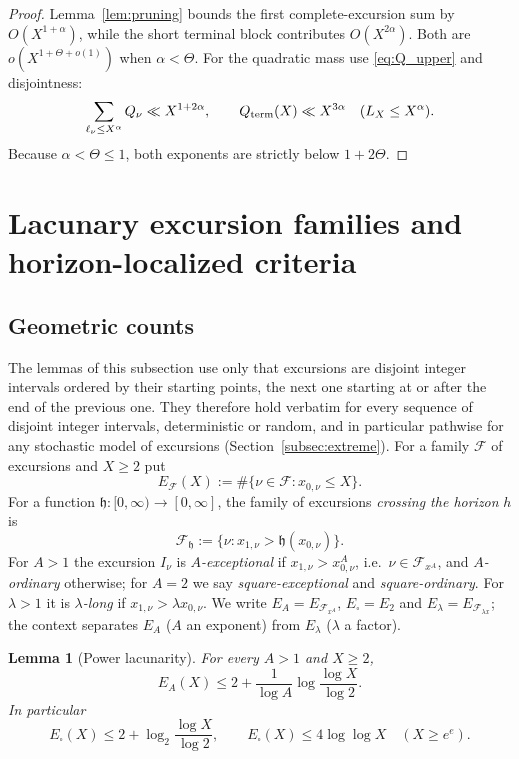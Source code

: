 \documentclass[11pt]{amsart}
\numberwithin{equation}{section}
\theoremstyle{plain}
\newtheorem{lemma}[theorem]{Lemma}
\theoremstyle{definition}
\theoremstyle{remark}
\newcommand{\F}{\mathcal{F}}
\begin{document}
\begin{proof}
Lemma~\ref{lem:pruning} bounds the first complete-excursion sum by
$O(X^{1+\alpha})$, while the short terminal block contributes
$O(X^{2\alpha})$.  Both are $o(X^{1+\Theta+o(1)})$ when $\alpha<\Theta$.
For the quadratic mass use \eqref{eq:Q_upper} and disjointness:
\[
 \sum_{\ell_\nu\le X^\alpha}Q_\nu\ll X^{1+2\alpha},
 \qquad
 Q_{\rm term}(X)\ll X^{3\alpha}
 \quad(L_X\le X^\alpha).
\]
Because $\alpha<\Theta\le1$, both exponents are strictly below
$1+2\Theta$.
\end{proof}

\section{Lacunary excursion families and horizon-localized criteria}
\label{sec:lacunary}

\subsection{Geometric counts}
\label{subsec:geometric}

The lemmas of this subsection use only that excursions are disjoint integer
intervals ordered by their starting points, the next one starting at or
after the end of the previous one. They therefore hold verbatim for every
sequence of disjoint integer intervals, deterministic or random, and in
particular pathwise for any stochastic model of excursions
(Section~\ref{subsec:extreme}). For a family $\F$ of excursions and $X\ge2$
put
\[
E_\F(X):=\#\{\nu\in\F:x_{0,\nu}\le X\}.
\]
For a function $\mathfrak h:[0,\infty)\to[0,\infty]$, the family of
excursions \emph{crossing the horizon} $h$ is
\[
\F_{\mathfrak h}:=\{\nu:x_{1,\nu}>\mathfrak h(x_{0,\nu})\}.
\]
For $A>1$ the excursion $I_\nu$ is \emph{$A$-exceptional} if
$x_{1,\nu}>x_{0,\nu}^A$, i.e.\ $\nu\in\F_{x^A}$, and \emph{$A$-ordinary}
otherwise; for $A=2$ we say \emph{square-exceptional} and
\emph{square-ordinary}. For $\lambda>1$ it is \emph{$\lambda$-long} if
$x_{1,\nu}>\lambda x_{0,\nu}$. We write $E_A=E_{\F_{x^A}}$,
$E_\square=E_2$ and $E_\lambda=E_{\F_{\lambda x}}$; the context separates
$E_A$ ($A$ an exponent) from $E_\lambda$ ($\lambda$ a factor).

\begin{lemma}[Power lacunarity]
\label{lem:power-lacunary}
For every $A>1$ and $X\ge2$,
\begin{equation}
\label{eq:power-lacunary-count}
E_A(X)\le2+\frac1{\log A}\log\frac{\log X}{\log2}.
\end{equation}
In particular
\begin{equation}
\label{eq:square-exception-count}
E_\square(X)\le2+\log_2\frac{\log X}{\log2},\qquad
E_\square(X)\le4\log\log X\quad(X\ge e^e).
\end{equation}
\end{lemma}
\end{document}
